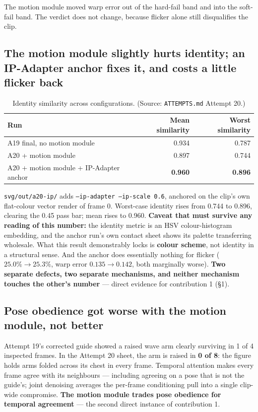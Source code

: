 \documentclass[11pt]{article}
\newcommand{\secsym}{\S}
\begin{document}
The motion module moved warp error out of the hard-fail band and into
the soft-fail band. The verdict does not change, because flicker alone
still disqualifies the clip.

\subsection{The motion module slightly hurts identity; an IP-Adapter anchor fixes it, and costs a little flicker back}
\label{sec:motionidentity}

\begin{table}[h]
\centering
\caption{Identity similarity across configurations. (Source: \texttt{ATTEMPTS.md} Attempt 20.)}
\label{tab:identitysim}
\begin{tabular}{@{}L{6.5cm}rr@{}}
\toprule
Run & Mean similarity & Worst similarity \\
\midrule
A19 final, no motion module & 0.934 & 0.787 \\
A20 + motion module & 0.897 & 0.744 \\
A20 + motion module + IP-Adapter anchor & \textbf{0.960} & \textbf{0.896} \\
\bottomrule
\end{tabular}
\end{table}

\texttt{svg/out/a20-ip/} adds \texttt{--ip-adapter --ip-scale 0.6},
anchored on the clip's own flat-colour vector render of frame 0.
Worst-case identity rises from 0.744 to 0.896, clearing the 0.45 pass
bar; mean rises to 0.960. \textbf{Caveat that must survive any reading of
this number:} the identity metric is an HSV colour-histogram embedding,
and the anchor run's own contact sheet shows its palette transferring
wholesale. What this result demonstrably locks is \textbf{colour scheme},
not identity in a structural sense. And the anchor does essentially
nothing for flicker ($25.0\% \rightarrow 25.3\%$, warp error $0.135
\rightarrow 0.142$, both marginally worse). \textbf{Two separate defects,
two separate mechanisms, and neither mechanism touches the other's
number} --- direct evidence for contribution 1 (\secsym1).

\subsection{Pose obedience got worse with the motion module, not better}
\label{sec:poseworse}

Attempt 19's corrected guide showed a raised wave arm clearly surviving
in 1 of 4 inspected frames. In the Attempt 20 sheet, the arm is raised in
\textbf{0 of 8}: the figure holds arms folded across its chest in every
frame. Temporal attention makes every frame agree with its neighbours ---
including agreeing on a pose that is not the guide's; joint denoising
averages the per-frame conditioning pull into a single clip-wide
compromise. \textbf{The motion module trades pose obedience for temporal
agreement} --- the second direct instance of contribution 1.
\end{document}
